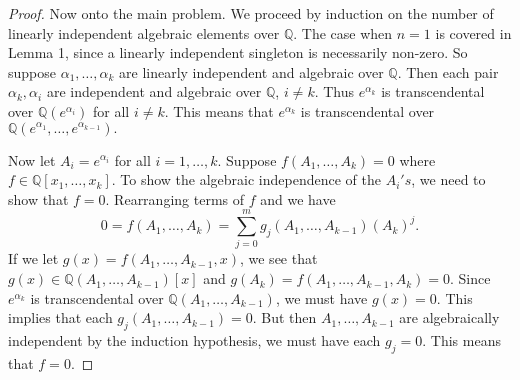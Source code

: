 \documentclass[12pt]{article}
\newcommand{\rats}{\mathbb{Q}}
\begin{document}
\begin{proof}
Now onto the main problem.  We proceed by induction on the number of linearly independent algebraic elements over
$\rats$.  The case when $n=1$ is covered in Lemma 1, since a linearly independent singleton is necessarily non-zero.
So suppose $\alpha_1, \ldots, \alpha_k$ are linearly independent and algebraic over $\rats$.  Then each pair
$\alpha_k, \alpha_i$ are independent and algebraic over $\rats$, $i\neq k$.  Thus $e^{\alpha_k}$ is transcendental over
$\rats(e^{\alpha_i})$ for all $i\neq k$.  This means that $e^{\alpha_k}$ is transcendental over $\rats
(e^{\alpha_1},\ldots,e^{\alpha_{k-1}}).$

Now let $A_i=e^{\alpha_i}$ for all $i=1,\ldots,k$.  Suppose $f(A_1,\ldots,A_k)=0$ where $f\in\rats[x_1,\ldots,x_k]$.
To show the algebraic independence of the $A_i's$, we need to show that $f=0$.  Rearranging terms of $f$ and we have
$$0 = f(A_1,\ldots,A_k) = \sum_{j=0}^{m}g_j(A_1,\ldots,A_{k-1})(A_k)^j.$$
If we let $g(x)=f(A_1,\ldots,A_{k-1},x)$, we see that $g(x)\in\rats(A_1,\ldots,A_{k-1})[x]$ and $g(A_k)=
f(A_1,\ldots,A_{k-1},A_k)=0$.  Since $e^{\alpha_k}$ is transcendental over $\rats(A_1,\ldots,A_{k-1})$, we must have
$g(x)=0$.  This implies that each $g_j(A_1,\ldots,A_{k-1})=0$.  But then $A_1,\ldots,A_{k-1}$ are algebraically
independent by the induction hypothesis, we must have each $g_j=0$.  This means that $f=0$.  
\end{proof}
\end{document}

